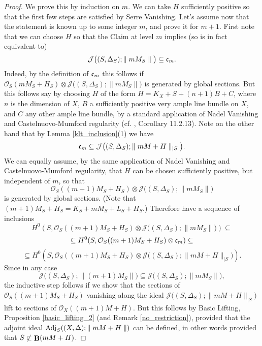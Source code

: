 \documentclass[11pt]{amsart}
\theoremstyle{plain}
\theoremstyle{definition}
\newcommand{\OO}{\mathcal  {O}}
\newcommand{\JJ}{\mathcal  {J}}
\newcommand{\frc}{\frak{c}}
\newcommand{\Adj}{{\rm Adj}}
\DeclareMathOperator{\BB}{{\bf B}}
\begin{document}
\begin{proof}
We prove this by induction on $m$. We can take $H$ sufficiently positive so that the first few steps are satisfied 
by Serre Vanishing. Let's assume now that the statement is known up to some integer $m$, and prove it for 
$m+1$. First note that we can choose $H$ so that the Claim at level $m$ implies (so is in fact equivalent to)
$$\JJ \big( (S, \Delta_S); \parallel mM_S\parallel \big) \subseteq \frc_m.$$ 
Indeed, by the definition of $\frc_m$ this follows if $\OO_S(mM_S + H_S)\otimes \JJ \big( (S, \Delta_S); \parallel mM_S\parallel \big)$ is generated by global sections. But this follows say by choosing $H$ of the form 
$H = K_X + S + (n+1) B + C$, where $n$ is the dimension of $X$, $B$ a sufficiently positive very ample line bundle on $X$, and $C$ any other ample line bundle, by a standard application of Nadel Vanishing and Castelnuovo-Mumford regularity (cf. \cite{positivity}, Corollary 11.2.13).
Note on the other hand that by Lemma \ref{klt_inclusion}(1) we have   
$$\frc_m \subseteq \JJ \big( (S, \Delta_S); \parallel mM + H \parallel_{|S} \big).$$
We can equally assume, by the same application of Nadel Vanishing and Castelnuovo-Mumford regularity, that  $H$ can be chosen sufficiently positive, but independent of $m$, so that 
$$\OO_S((m+1)M_S + H_S) \otimes   \JJ \big( (S, \Delta_S); \parallel mM_S\parallel \big)$$
is generated by global sections. (Note that $(m+1)M_S + H_S = K_S + mM_S + L_S + H_S$.)
Therefore have a sequence of inclusions
$$H^0(S,  \OO_S((m+1)M_S + H_S)
\otimes   \JJ \big( (S, \Delta_S); \parallel mM_S\parallel \big))
\subseteq$$
$$\subseteq H^0(S,  \OO_S((m+1)M_S + H_S) \otimes  \frc_m) \subseteq$$
$$\subseteq H^0 (S,  \OO_S((m+1)M_S + H_S) \otimes \JJ \big( (S, \Delta_S); \parallel mM + H \parallel_{|S} \big) ).$$
Since in any case 
$$\JJ \big( (S, \Delta_S); \parallel (m+1)M_S\parallel \big) \subseteq 
\JJ \big( (S, \Delta_S); \parallel mM_S\parallel \big),$$
the inductive step follows if we show that the sections of $\OO_S((m+1)M_S + H_S)$ vanishing along the ideal $\JJ \big( (S, \Delta_S); \parallel mM + H \parallel_{|S} \big)$ lift to sections of $\OO_X((m+1)M + H)$.
But this follows by Basic Lifting, Proposition \ref{basic_lifting_2} (and Remark \ref{no_restriction}), provided that the adjoint ideal $\Adj_S ((X, \Delta); \parallel mM + H \parallel)$ can be defined, in other words provided that $S \not
\subset \BB (mM + H)$. 


\end{proof}
\end{document}
